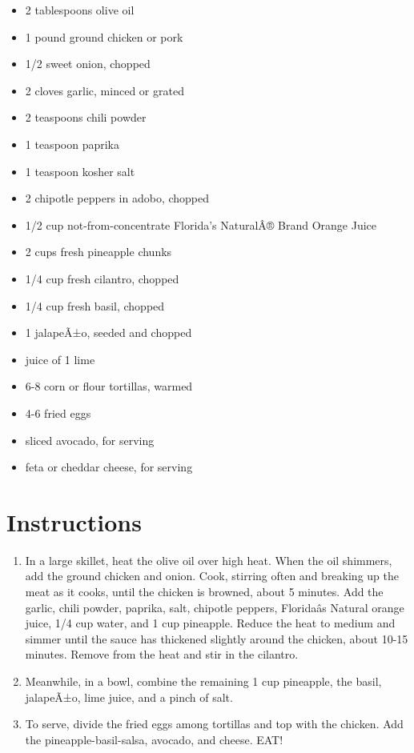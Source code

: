\documentclass[
  letterpaper,
  DIV=11,
  numbers=noendperiod,
  titlepage=false]{scrreprt}
\providecommand{\tightlist}{%
  \setlength{\itemsep}{0pt}\setlength{\parskip}{0pt}}\usepackage{longtable,booktabs,array}
\begin{document}
\begin{itemize}
\tightlist
\item
  2 tablespoons olive oil
\item
  1 pound ground chicken or pork
\item
  1/2 sweet onion, chopped
\item
  2 cloves garlic, minced or grated
\item
  2 teaspoons chili powder
\item
  1 teaspoon paprika
\item
  1 teaspoon kosher salt
\item
  2 chipotle peppers in adobo, chopped
\item
  1/2 cup not-from-concentrate Florida's NaturalÂ® Brand Orange Juice
\item
  2 cups fresh pineapple chunks
\item
  1/4 cup fresh cilantro, chopped
\item
  1/4 cup fresh basil, chopped
\item
  1 jalapeÃ±o, seeded and chopped
\item
  juice of 1 lime
\item
  6-8 corn or flour tortillas, warmed
\item
  4-6 fried eggs
\item
  sliced avocado, for serving
\item
  feta or cheddar cheese, for serving
\end{itemize}

\section{Instructions}\label{instructions-115}

\begin{enumerate}
\def\labelenumi{\arabic{enumi}.}
\tightlist
\item
  In a large skillet, heat the olive oil over high heat. When the oil
  shimmers, add the ground chicken and onion. Cook, stirring often and
  breaking up the meat as it cooks, until the chicken is browned, about
  5 minutes. Add the garlic, chili powder, paprika, salt, chipotle
  peppers, Floridaâs Natural orange juice, 1/4 cup water, and 1 cup
  pineapple. Reduce the heat to medium and simmer until the sauce has
  thickened slightly around the chicken, about 10-15 minutes. Remove
  from the heat and stir in the cilantro.
\item
  Meanwhile, in a bowl, combine the remaining 1 cup pineapple, the
  basil, jalapeÃ±o, lime juice, and a pinch of salt.
\item
  To serve, divide the fried eggs among tortillas and top with the
  chicken. Add the pineapple-basil-salsa, avocado, and cheese. EAT!
\end{enumerate}
\end{document}
